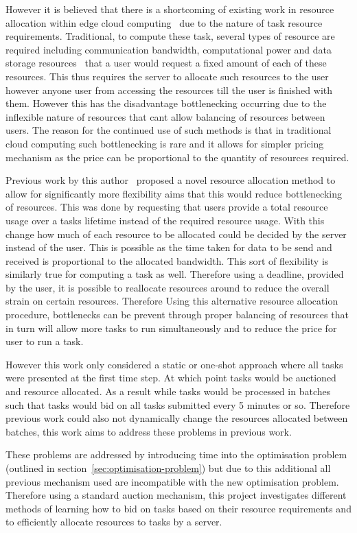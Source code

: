 However it is believed that there is a shortcoming of existing work in resource allocation within
edge cloud computing~\citep{vaji_infocom, Bi2019} due to the nature of task resource requirements. Traditional, to
compute these task, several types of resource are required including communication bandwidth, computational power and
data storage resources~\cite{vaji_infocom} that a user would request a fixed amount of each of these resources.
This thus requires the server to allocate such resources to the user however anyone user from accessing the resources
till the user is finished with them. However this has the disadvantage bottlenecking occurring due to the inflexible
nature of resources that cant allow balancing of resources between users. The reason for the continued use of such
methods is that in traditional cloud computing such bottlenecking is rare and it allows for simpler pricing mechanism
as the price can be proportional to the quantity of resources required.

Previous work by this author~\citep{FlexibleResourceAllocation} proposed a novel resource allocation method to allow
for significantly more flexibility aims that this would reduce bottlenecking of resources. This was done by requesting
that users provide a total resource usage over a tasks lifetime instead of the required resource usage. With this
change how much of each resource to be allocated could be decided by the server instead of the user. This is possible
as the time taken for data to be send and received is proportional to the allocated bandwidth. This sort of flexibility
is similarly true for computing a task as well. Therefore using a deadline, provided by the user, it is possible
to reallocate resources around to reduce the overall strain on certain resources. Therefore Using this alternative
resource allocation procedure, bottlenecks can be prevent through proper balancing of resources that in turn will allow
more tasks to run simultaneously and to reduce the price for user to run a task.

However this work only considered a static or one-shot approach where all tasks were presented at the first time step.
At which point tasks would be auctioned and resource allocated. As a result while tasks would be processed in batches
such that tasks would bid on all tasks submitted every 5 minutes or so. Therefore previous work could also not
dynamically change the resources allocated between batches, this work aims to address these problems in previous work.

These problems are addressed by introducing time into the optimisation problem (outlined in
section~\ref{sec:optimisation-problem}) but due to this additional all previous mechanism used are incompatible with
the new optimisation problem. Therefore using a standard auction mechanism, this project investigates different methods
of learning how to bid on tasks based on their resource requirements and to efficiently allocate resources to tasks
by a server.

